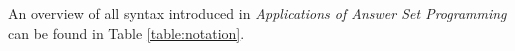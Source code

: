 \documentclass[runningheads]{llncs}
\newcommand{\papertitle}{Applications of Answer Set Programming}
\begin{document}
An overview of all syntax introduced in \textit{\papertitle} can be found in Table \ref{table:notation}.




\begin{comment}

\section{Open Questions}

After reading this paper, I still have some unanswered questions: 

\begin{itemize}
    \item Does ``axiomite'' mean that we ``give data to the model'' so that we are able to execute the program? 
    \item Space shuttle example formula (1). The X is a variable? Similar to a variable in a function call? What would be pass to pos here? A switch and the state of a switch? What does pos return? A switch?
    \item How can we make sure that a program terminates (I am aware of the halting problem)? Is there a way to detect infinite loops (or recursion that does not terminate)?
    \item What is a dynamic domain? I could not find a definition for this term. 
    \item What is the difference  between an atom and a predicate? Is it the same thing? 
    \item Can an answer set also contain numeric values? In other words: Can we only answer decision problems or could be we write a program that outputs ``The answer to your question is 42''?
    \item I am not sure if I got the difference between a literal and an atom right. Is my guess correct?
\end{itemize}


\end{comment}







\end{document}
